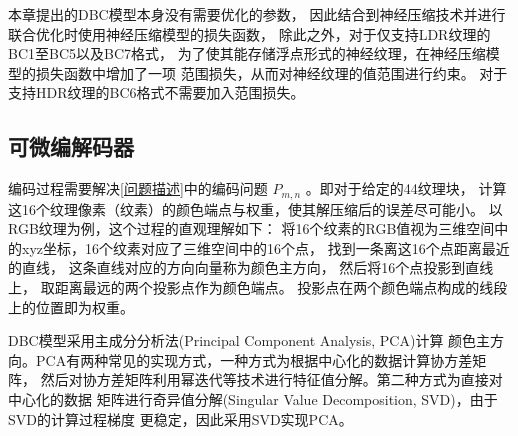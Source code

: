 本章提出的DBC模型本身没有需要优化的参数，
因此结合到神经压缩技术并进行联合优化时使用神经压缩模型的损失函数，
除此之外，对于仅支持LDR纹理的BC1至BC5以及BC7格式，
为了使其能存储浮点形式的神经纹理，在神经压缩模型的损失函数中增加了一项
范围损失，从而对神经纹理的值范围进行约束。
对于支持HDR纹理的BC6格式不需要加入范围损失。


\subsection{可微编解码器}

编码过程需要解决\ref{问题描述}中的编码问题 $P_{m,n}$ 。即对于给定的4\times4纹理块，
计算这16个纹理像素（纹素）的颜色端点与权重，使其解压缩后的误差尽可能小。
以RGB纹理为例，这个过程的直观理解如下：
将16个纹素的RGB值视为三维空间中的xyz坐标，16个纹素对应了三维空间中的16个点，
找到一条离这16个点距离最近的直线，
这条直线对应的方向向量称为颜色主方向，
然后将16个点投影到直线上，
取距离最远的两个投影点作为颜色端点。
投影点在两个颜色端点构成的线段上的位置即为权重。

DBC模型采用主成分分析法(Principal Component Analysis, PCA)计算
颜色主方向。PCA有两种常见的实现方式，一种方式为根据中心化的数据计算协方差矩阵，
然后对协方差矩阵利用幂迭代等技术进行特征值分解。第二种方式为直接对中心化的数据
矩阵进行奇异值分解(Singular Value Decomposition, SVD)，由于SVD的计算过程梯度
更稳定，因此采用SVD实现PCA。

